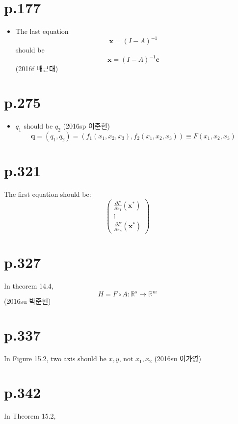 \documentclass[a4paper]{article}
\begin{document}
\section{p.177} %
\label{sec:p_177}
\begin{itemize}
	\item The last equation
	\[
		\mathbf{x}=(I-A)^{-1}
	\]
	should be
	\[
		\mathbf{x}=(I-A)^{-1}\mathbf{c}
	\]
	(2016f 배근태)
\end{itemize}

\section{p.275} %
\label{sec:p_275}
\begin{itemize}
	\item $q_1$ should be $q_2$ (2016sp 이준현)
	\[
		\mathbf{q}=(q_1,q_2)=\left(f_1(x_1,x_2,x_3),f_2(x_1,x_2,x_3)\right)\equiv F(x_1,x_2,x_3)
	\]
\end{itemize}

\section{p.321}
The first equation should be: \[
\begin{pmatrix}
	\frac{\partial F}{\partial x_1}(\mathbf{x}^\ast)\\
	\vdots\\
	\frac{\partial F}{\partial x_n}(\mathbf{x}^\ast)
\end{pmatrix}
\]

\section{p.327} %
\label{sec:p_327}
In theorem 14.4,
\[
	H = F \circ A : \mathbb{R}^s \rightarrow \mathbb{R}^m
\]
(2016su 박준현)

\section{p.337} %
\label{sec:p_337}
In Figure 15.2, two axis should be $x,y$, not $x_1, x_2$ (2016su 이가영)

\section{p.342} %
\label{sec:p_342}
In Theorem 15.2,
\end{document}
